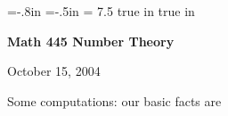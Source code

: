 \def\cmb{\MidnightBlue}	  %
\def\cnb{\NavyBlue}	  %
\def\crb{\RoyalBlue}	  %
\def\cce{\Cerulean}	  %
\def\ccy{\Cyan}		  %
\def\cpb{\ProcessBlue}	  %
\def\csb{\SkyBlue}	  %
\def\ctu{\Turquoise}	  %
\def\ctb{\TealBlue}	  %
\def\caq{\Aquamarine}	  %
\def\cbg{\BlueGreen}	  %
\def\cem{\Emerald}	  %
\def\cjg{\JungleGreen}	  %
\def\csg{\SeaGreen}	  %
\def\cgg{\Green}	  %
\def\cfg{\ForestGreen}	  %
\def\cpg{\PineGreen}	  %
\def\clg{\LimeGreen}	  %
\def\cyg{\YellowGreen}	  %
\def\cspg{\SpringGreen}	  %
\def\cog{\OliveGreen}	  %
\def\pars{\RawSienna}	  %
\def\cse{\Sepia}		  %
\def\cbr{\Brown}		  %
\def\cta{\Tan}		  %
\def\cgr{\Gray}		  %
\def\cbl{\Black}		  %
\def\cwh{\White}		  %


\voffset=-.8in
\hoffset=-.5in
\hsize = 7.5 true in
 true in


\overfullrule=0pt


\def\ctln{\centerline}
\def\u{\underbar}
\def\ssk{\smallskip}
\def\msk{\medskip}
\def\bsk{\bigskip}
\def\hsk{\hskip.1in}
\def\hhsk{\hskip.2in}

\def\lra{$\Leftrightarrow$ }


\ctln{\bf Math 445 Number Theory}

\smallskip

\ctln{October 15, 2004}

\medskip

Some computations: our basic facts are

